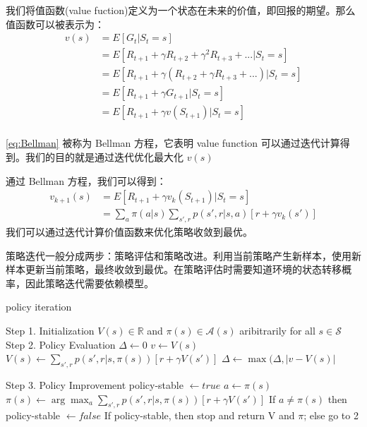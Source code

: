我们将值函数(value fuction)定义为一个状态在未来的价值，即回报的期望。那么值函数可以被表示为：
\begin{equation}\label{eq:Bellman}
\begin{aligned}
v(s) & = E[G_t|S_t = s] \\
     & = E[R_{t+1} + \gamma R_{t+2} + \gamma^2 R_{t+3}+...|S_t=s]\\
     & = E[R_{t+1} + \gamma(R_{t+2} + \gamma R_{t+3}+...)|S_t=s]\\
     & = E[R_{t+1} + \gamma G_{t+1}|S_t=s]\\
     & = E[R_{t+1} + \gamma v(S_{t+1})|S_t=s]\\
\end{aligned}
\end{equation}

\eqref{eq:Bellman} 被称为 Bellman 方程，它表明 value function 可以通过迭代计算得到。我们的目的就是通过迭代优化最大化 $v(s)$

通过 Bellman 方程，我们可以得到：
\begin{equation}
\begin{aligned}
v_{k+1}(s) & = E[R_{t+1} + \gamma v_k(S_{t+1})|S_t=s]\\
           & = \sum_a \pi(a|s)\sum_{s',r}p(s', r| s, a)[r+\gamma v_k(s')]
\end{aligned}
\end{equation}
我们可以通过迭代计算价值函数来优化策略收敛到最优。

策略迭代一般分成两步：策略评估和策略改进。利用当前策略产生新样本，使用新样本更新当前策略，最终收敛到最优。在策略评估时需要知道环境的状态转移概率，因此策略迭代需要依赖模型。

\begin{algorithm}[H]
    \small
    \caption{policy iteration}\label{alg:policy_iteration}
    \begin{algorithmic}
        \State Step 1. Initialization
        \State $V(s) \in \mathbb{R}$ and $\pi(s) \in \mathcal{A}(s)$ aribitrarily for all $s \in \mathcal{S}$
        \State Step 2. Policy Evaluation
        \Repeat
        \State $\Delta \leftarrow 0$
        \State $v \leftarrow V(s)$
        \State $V(s)\leftarrow \sum_{s', r} p(s', r|s, \pi(s))[r + \gamma V(s')]$
        \State $\Delta \leftarrow \max(\Delta, |v-V(s)|$
        \EndFor

        \Until{$\Delta < \theta$}

        \State Step 3. Policy Improvement
        \State policy-stable $\leftarrow  true$
        \State $a \leftarrow \pi(s)$
        \State $\pi(s) \leftarrow \arg\max_a\sum_{s', r}p(s', r|s, \pi(s))[r + \gamma V(s')]$
        \State If $a \neq \pi(s)$ then policy-stable $\leftarrow  false$
        \EndFor
        \State If policy-stable, then stop and return V and $\pi$; else go to 2
    \end{algorithmic}
\end{algorithm}

